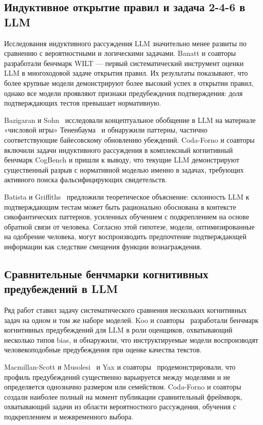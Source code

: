 \subsection{Индуктивное открытие правил и задача 2-4-6 в LLM}

Исследования индуктивного рассуждения LLM значительно менее развиты по сравнению с вероятностными и логическими задачами. Banatt и соавторы~\cite{banatt2024wilt} разработали бенчмарк WILT --- первый систематический инструмент оценки LLM в многоходовой задаче открытия правил. Их результаты показывают, что более крупные модели демонстрируют более высокий успех в открытии правил, однако все модели проявляют признаки предубеждения подтверждения: доля подтверждающих тестов превышает нормативную.

Bazigaran и Sohn~\cite{bazigaran2025concept} исследовали концептуальное обобщение в LLM на материале «числовой игры» Тененбаума~\cite{tenenbaum1999bayesian} и обнаружили паттерны, частично соответствующие байесовскому обновлению убеждений. Coda-Forno и соавторы~\cite{coda2024cogbench} включили задачи индуктивного рассуждения в комплексный когнитивный бенчмарк CogBench и пришли к выводу, что текущие LLM демонстрируют существенный разрыв с нормативной моделью именно в задачах, требующих активного поиска фальсифицирующих свидетельств.

Batista и Griffiths~\cite{batista2026rational} предложили теоретическое объяснение: склонность LLM к подтверждающим тестам может быть рационально обоснована в контексте сикофантических паттернов, усиленных обучением с подкреплением на основе обратной связи от человека. Согласно этой гипотезе, модели, оптимизированные на одобрение человека, могут воспроизводить предпочтение подтверждающей информации как следствие смещения функции вознаграждения.

\subsection{Сравнительные бенчмарки когнитивных предубеждений в LLM}

Ряд работ ставил задачу систематического сравнения нескольких когнитивных задач на одном и том же наборе моделей. Koo и соавторы~\cite{koo2024benchmarking} разработали бенчмарк когнитивных предубеждений для LLM в роли оценщиков, охватывающий несколько типов bias, и обнаружили, что инструктируемые модели воспроизводят человекоподобные предубеждения при оценке качества текстов.

Macmillan-Scott и Musolesi~\cite{macmillan2024irrationality} и Yax и соавторы~\cite{yax2024studying} продемонстрировали, что профиль предубеждений существенно варьируется между моделями и не определяется однозначно размером или семейством. Coda-Forno и соавторы~\cite{coda2024cogbench} создали наиболее полный на момент публикации сравнительный фреймворк, охватывающий задачи из области вероятностного рассуждения, обучения с подкреплением и межвременного выбора.

